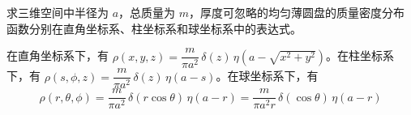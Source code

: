 \begin{question}
求三维空间中半径为 \(a\)，总质量为 \(m\)，厚度可忽略的均匀薄圆盘的质量密度分布函数分别在直角坐标系、柱坐标系和球坐标系中的表达式。
\begin{solution}
在直角坐标系下，有 \(\rho(x,y,z)=\dfrac{m}{\pi a^2}\,\delta(z)\,\eta(a-\sqrt{x^2+y^2})\)。在柱坐标系下，有 \(\rho(s,\phi,z)=\dfrac{m}{\pi a^2}\,\delta(z)\,\eta(a-s)\)。在球坐标系下，有 \[ \rho(r,\theta,\phi)=\frac{m}{\pi a^2}\,\delta(r\cos\theta)\,\eta(a-r)=\frac{m}{\pi a^2 r}\,\delta(\cos\theta)\,\eta(a-r) \]
\end{solution}
\end{question}
